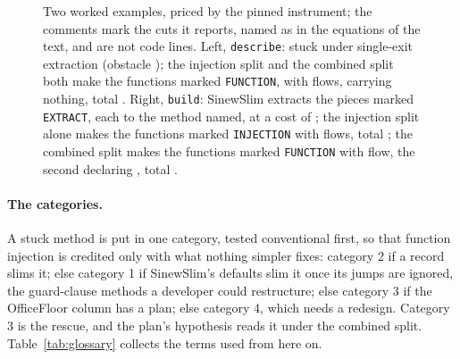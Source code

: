 \documentclass[11pt,a4paper]{article}
\newcommand{\sig}[1]{\texttt{#1}}
\begin{document}
\begin{figure}[tbp]
\begin{minipage}[t]{0.47\textwidth}

\end{minipage}\hfill
\begin{minipage}[t]{0.5\textwidth}

\end{minipage}
\caption{Two worked examples, priced by the pinned instrument; the comments mark the cuts it reports, named as in the equations of the text, and are not code lines. Left, \sig{describe}: stuck under single-exit extraction (obstacle \emph{\exaSinewObstacle}); the injection split and the combined split both make the \exaInjFunctions{} functions marked \sig{FUNCTION}, with \exaInjEdges{} flows, carrying nothing, total \exaInjTotal{}. Right, \sig{build}: SinewSlim extracts the \exbSinewPieces{} pieces marked \sig{EXTRACT}, each to the method named, at a cost of \exbSinewCost{}; the injection split alone makes the \exbInjFunctions{} functions marked \sig{INJECTION} with \exbInjEdges{} flows, total \exbInjTotal{}; the combined split makes the \exbCombFunctions{} functions marked \sig{FUNCTION} with \exbCombEdges{} flow, the second declaring \exbCombDeclares{}, total \exbCombSum{}.}
\label{fig:examples}
\end{figure}

\paragraph{The categories.} A stuck method is put in one category, tested
conventional first, so that function injection is credited only with what
nothing simpler fixes: category 2 if a record slims it; else category 1 if
SinewSlim's defaults slim it once its jumps are ignored, the guard-clause
methods a developer could restructure; else category 3 if the OfficeFloor
column has a plan; else category 4, which needs a redesign. Category 3 is
the rescue, and the plan's hypothesis reads it under the combined split.
Table~\ref{tab:glossary} collects the terms used from here on.
\end{document}

